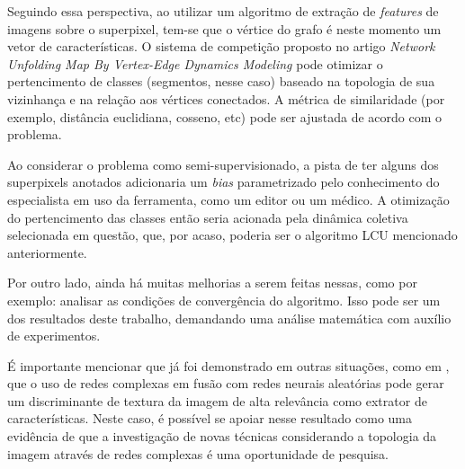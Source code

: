 Seguindo essa perspectiva, ao utilizar um algoritmo de extração de
\textit{features} de imagens sobre o superpixel, tem-se que o vértice
do grafo é neste momento um vetor de características. O sistema de
competição proposto no artigo \textit{Network Unfolding Map By
Vertex-Edge Dynamics Modeling} pode otimizar o pertencimento de
classes (segmentos, nesse caso) baseado na topologia de sua vizinhança
e na relação aos vértices conectados. A métrica de similaridade
(por exemplo, distância euclidiana, cosseno, etc) pode ser
ajustada de acordo com o problema.

Ao considerar o problema como semi-supervisionado, a pista de ter
alguns dos superpixels anotados adicionaria um \textit{bias}
parametrizado pelo conhecimento do especialista em uso da ferramenta,
como um editor ou um médico. A otimização do pertencimento das classes
então seria acionada pela dinâmica coletiva selecionada em questão,
que, por acaso, poderia ser o algoritmo LCU mencionado anteriormente.

Por outro lado, ainda há muitas melhorias a serem feitas nessas, como
por exemplo: analisar as condições de convergência do algoritmo. Isso
pode ser um dos resultados deste trabalho, demandando uma análise
matemática com auxílio de experimentos.

É importante mencionar que já foi demonstrado em outras situações,
como em \cite{JarbasComplexNetworks2020}, que o uso de redes complexas
em fusão com redes neurais aleatórias pode gerar um discriminante de
textura da imagem de alta relevância como extrator de
características. Neste caso, é possível se apoiar nesse resultado como
uma evidência de que a investigação de novas técnicas considerando a
topologia da imagem através de redes complexas é uma oportunidade de
pesquisa.

